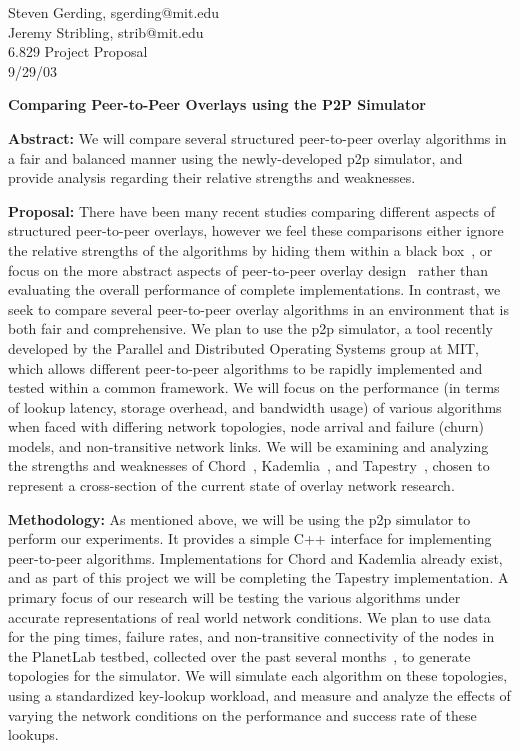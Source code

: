 \documentclass[letter,10pt]{article}
\begin{document}
\begin{flushright}
Steven Gerding, sgerding@mit.edu \\
Jeremy Stribling, strib@mit.edu \\
6.829 Project Proposal \\
9/29/03
\end{flushright}

\begin{center}
{\bf Comparing Peer-to-Peer Overlays using the P2P Simulator}
\end{center}

{\bf Abstract:} We will compare several structured peer-to-peer overlay 
algorithms in a fair and balanced manner using the newly-developed p2p 
simulator, and provide analysis regarding their relative strengths and 
weaknesses.

{\bf Proposal:} There have been many recent studies comparing different
aspects of structured peer-to-peer overlays, however we feel these comparisons
either ignore the relative strengths of the algorithms by hiding them within
a black box~\cite{rrk-iptps03}, or focus on the more abstract aspects of 
peer-to-peer overlay design~\cite{gummadi-geometry} rather than evaluating 
the overall performance of complete implementations.  In contrast, we seek
to compare several peer-to-peer overlay algorithms in an environment that
is both fair and comprehensive.  We plan to use the p2p simulator, a tool 
recently developed by the Parallel and Distributed Operating Systems group at 
MIT, which allows different peer-to-peer algorithms to be rapidly implemented 
and tested within a common framework.  We will focus on the performance (in 
terms of lookup latency, storage overhead, and bandwidth usage) of
various algorithms when faced with differing network topologies, node arrival
and failure (churn) models, and non-transitive network links.  We will be 
examining and analyzing the strengths and weaknesses of Chord~\cite{Chord}, 
Kademlia~\cite{Kademlia}, and Tapestry~\cite{tapestry_jsac}, chosen to 
represent a cross-section of the current state of overlay network research.

{\bf Methodology:} As mentioned above, we will be using the p2p simulator
to perform our experiments.  It provides a simple C++ interface for 
implementing peer-to-peer algorithms.  Implementations for Chord and Kademlia 
already exist, and as part of this project we will be completing the Tapestry 
implementation.  A primary focus of our research will be testing the various 
algorithms under accurate representations of real world network conditions.  
We plan to use data for the ping times, failure rates, and non-transitive 
connectivity of the nodes in the PlanetLab testbed, collected over the past
several months~\cite{appweb}, to generate topologies for the simulator.
We will simulate each algorithm on these topologies, using a standardized
key-lookup workload, and measure and analyze the effects of varying the
network conditions on the performance and success rate of these lookups.
\end{document}
